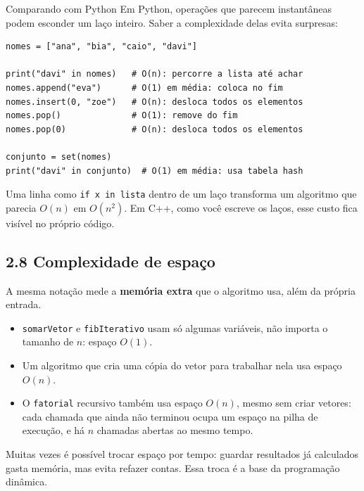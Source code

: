 \begin{destaque}{Comparando com Python}
Em Python, operações que parecem instantâneas podem esconder um laço inteiro. Saber a complexidade delas evita surpresas:

\begin{codigo}
\begin{Verbatim}[breaklines=true, breaksymbolleft={}, fontsize=\footnotesize]
nomes = ["ana", "bia", "caio", "davi"]

print("davi" in nomes)   # O(n): percorre a lista até achar
nomes.append("eva")      # O(1) em média: coloca no fim
nomes.insert(0, "zoe")   # O(n): desloca todos os elementos
nomes.pop()              # O(1): remove do fim
nomes.pop(0)             # O(n): desloca todos os elementos

conjunto = set(nomes)
print("davi" in conjunto)  # O(1) em média: usa tabela hash
\end{Verbatim}
\end{codigo}

Uma linha como \texttt{if x in lista} dentro de um laço transforma um algoritmo que parecia $O(n)$ em $O(n^2)$. Em C++, como você escreve os laços, esse custo fica visível no próprio código.
\end{destaque}

\subsection{2.8 Complexidade de espaço}

A mesma notação mede a \textbf{memória extra} que o algoritmo usa, além da própria entrada.

\begin{itemize}
  \item \texttt{somarVetor} e \texttt{fibIterativo} usam só algumas variáveis, não importa o tamanho de $n$: espaço $O(1)$.
  \item Um algoritmo que cria uma cópia do vetor para trabalhar nela usa espaço $O(n)$.
  \item O \texttt{fatorial} recursivo também usa espaço $O(n)$, mesmo sem criar vetores: cada chamada que ainda não terminou ocupa um espaço na pilha de execução, e há $n$ chamadas abertas ao mesmo tempo.
\end{itemize}

Muitas vezes é possível trocar espaço por tempo: guardar resultados já calculados gasta memória, mas evita refazer contas. Essa troca é a base da programação dinâmica.

